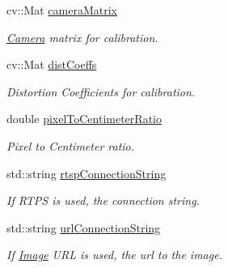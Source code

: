 \begin{DoxyCompactItemize}
\mbox{\label{structdto_1_1_camera_af4e34fcf3efb6f871c2f35c753998138}} 
cv\+::\+Mat \mbox{\hyperlink{structdto_1_1_camera_af4e34fcf3efb6f871c2f35c753998138}{camera\+Matrix}}
\begin{DoxyCompactList}\small\item\em \mbox{\hyperlink{structdto_1_1_camera}{Camera}} matrix for calibration. \end{DoxyCompactList}\item 
\mbox{\label{structdto_1_1_camera_a0d4f93e1fb6eed2d1203399aaabad67e}} 
cv\+::\+Mat \mbox{\hyperlink{structdto_1_1_camera_a0d4f93e1fb6eed2d1203399aaabad67e}{dist\+Coeffs}}
\begin{DoxyCompactList}\small\item\em Distortion Coefficients for calibration. \end{DoxyCompactList}\item 
\mbox{\label{structdto_1_1_camera_a7570940124d830d396a8869fee0001dc}} 
double \mbox{\hyperlink{structdto_1_1_camera_a7570940124d830d396a8869fee0001dc}{pixel\+To\+Centimeter\+Ratio}}
\begin{DoxyCompactList}\small\item\em Pixel to Centimeter ratio. \end{DoxyCompactList}\item 
\mbox{\label{structdto_1_1_camera_a65783c64c674e14c3599613362a841da}} 
std\+::string \mbox{\hyperlink{structdto_1_1_camera_a65783c64c674e14c3599613362a841da}{rtsp\+Connection\+String}}
\begin{DoxyCompactList}\small\item\em If R\+T\+PS is used, the connection string. \end{DoxyCompactList}\item 
\mbox{\label{structdto_1_1_camera_ab72f63ea7f57609b227033c217153a02}} 
std\+::string \mbox{\hyperlink{structdto_1_1_camera_ab72f63ea7f57609b227033c217153a02}{url\+Connection\+String}}
\begin{DoxyCompactList}\small\item\em If \mbox{\hyperlink{structdto_1_1_image}{Image}} U\+RL is used, the url to the image. \end{DoxyCompactList}\item 

\end{DoxyCompactItemize}
